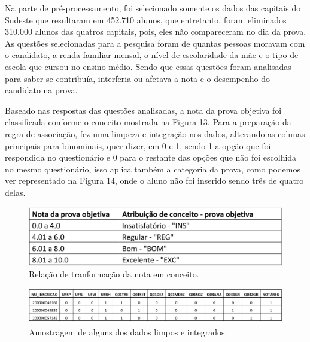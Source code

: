 \par
Na parte de pré-processamento, foi selecionado somente os dados das capitais do Sudeste que resultaram em 452.710 alunos, que entretanto, foram eliminados 310.000 alunos das quatros capitais, pois, eles não compareceram no dia da prova. As questões selecionadas para a pesquisa  foram de quantas pessoas moravam com o candidato, a renda familiar mensal, o nível de escolaridade da mãe e o tipo de escola que cursou no ensino médio. Sendo que essas questões foram analisadas para saber se contribuía, interferia ou afetava a nota e o desempenho do candidato na prova.

\par
Baseado nas respostas das questões analisadas, a nota da prova objetiva foi classificada conforme o conceito mostrada na Figura 13. Para a preparação da regra de associação,  fez uma limpeza e integração nos dados, alterando as colunas principais para binominais, quer dizer, em 0 e 1, sendo 1 a opção que foi respondida no questionário e 0 para o restante das opções que não foi escolhida no mesmo questionário, isso aplica também a categoria da prova, como podemos ver representado na Figura 14, onde o aluno não foi inserido sendo três de quatro delas. 


\begin{figure}[!htp]
	\begin{center}
    \caption{\label{fig:waveform_fig} Relação de tranformação da nota em conceito.}
	\includegraphics[scale=0.50]{Figuras/Prova_objetiva.png}
	\end{center}
\end{figure}

\begin{figure}[!htp]
	\begin{center}
    \caption{\label{fig:waveform_fig} Amostragem de alguns dos dados limpos e integrados.}
	\includegraphics[scale=0.49]{Figuras/Dados_limpos_integrados.png}
	\end{center}
\end{figure}

